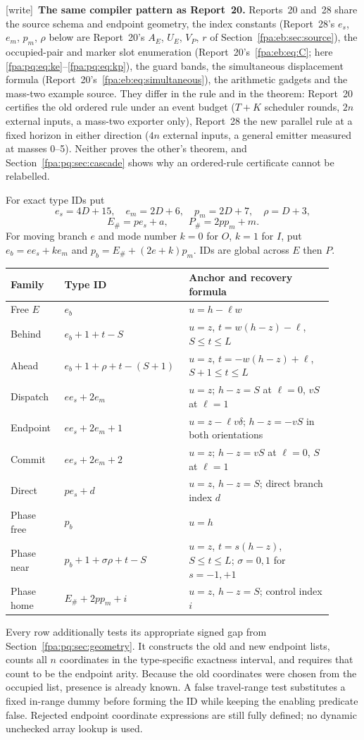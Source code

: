 \documentclass[11pt,a4paper]{article}
\numberwithin{equation}{section}
\newcommand{\wtag}{\textup{[write]}}
\begin{document}
\wtag\ \textbf{The same compiler pattern as Report~20.} Reports~20 and~28 share the source schema and endpoint geometry, the index constants (Report~28's $e_s$, $e_m$, $p_m$, $\rho$ below are Report~20's $A_E$, $U_E$, $V_P$, $r$ of Section~\ref{fpa:eb:sec:source}), the occupied-pair and marker slot enumeration (Report~20's~\eqref{fpa:eb:eq:C}; here \eqref{fpa:pq:eq:ke}--\eqref{fpa:pq:eq:kp}), the guard bands, the simultaneous displacement formula (Report~20's~\eqref{fpa:eb:eq:simultaneous}), the arithmetic gadgets and the mass-two example source. They differ in the rule and in the theorem: Report~20 certifies the old ordered rule under an event budget ($T+K$ scheduler rounds, $2n$ external inputs, a mass-two exporter only), Report~28 the new parallel rule at a fixed horizon in either direction ($4n$ external inputs, a general emitter measured at masses 0--5). Neither proves the other's theorem, and Section~\ref{fpa:pq:sec:cascade} shows why an ordered-rule certificate cannot be relabelled.

For exact type IDs put
\[
e_s=4D+15,\quad e_m=2D+6,\quad p_m=2D+7,\quad \rho=D+3,
\]
\[
E_\#=pe_s+a,\qquad P_\#=2pp_m+m.
\]
For moving branch $e$ and mode number $k=0$ for $O$, $k=1$ for $I$, put
$e_b=ee_s+ke_m$ and $p_b=E_\#+(2e+k)p_m$. IDs are global across $E$ then $P$.
\begin{longtable}{@{}p{0.16\linewidth}p{0.32\linewidth}p{0.43\linewidth}@{}}
\toprule Family & Type ID & Anchor and recovery formula\\\midrule\endhead
Free $E$ & $e_b$ & $u=h-\ell w$\\[4pt]
Behind & $e_b+1+t-S$ & $u=z$, $t=w(h-z)-\ell$, $S\le t\le L$\\[4pt]
Ahead & $e_b+1+\rho+t-(S+1)$ & $u=z$, $t=-w(h-z)+\ell$, $S+1\le t\le L$\\[4pt]
Dispatch & $ee_s+2e_m$ & $u=z$; $h-z=S$ at $\ell=0$, $vS$ at $\ell=1$\\[4pt]
Endpoint & $ee_s+2e_m+1$ & $u=z-\ell v\delta$; $h-z=-vS$ in both orientations\\[4pt]
Commit & $ee_s+2e_m+2$ & $u=z$; $h-z=vS$ at $\ell=0$, $S$ at $\ell=1$\\[4pt]
Direct & $pe_s+d$ & $u=z$, $h-z=S$; direct branch index $d$\\[4pt]
Phase free & $p_b$ & $u=h$\\[4pt]
Phase near & $p_b+1+\sigma\rho+t-S$ & $u=z$, $t=s(h-z)$, $S\le t\le L$; $\sigma=0,1$ for $s=-1,+1$\\[4pt]
Phase home & $E_\#+2pp_m+i$ & $u=z$, $h-z=S$; control index $i$\\\bottomrule
\end{longtable}
Every row additionally tests its appropriate signed gap from Section~\ref{fpa:pq:sec:geometry}. It constructs the old and new endpoint lists, counts all $n$ coordinates in the type-specific exactness interval, and requires that count to be the endpoint arity. Because the old coordinates were chosen from the occupied list, presence is already known. A false travel-range test substitutes a fixed in-range dummy before forming the ID while keeping the enabling predicate false. Rejected endpoint coordinate expressions are still fully defined; no dynamic unchecked array lookup is used.
\end{document}
